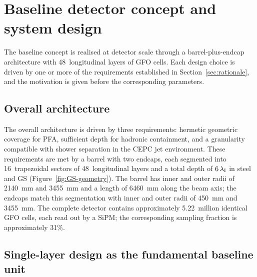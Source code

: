 \section{Baseline detector concept and system design}
\label{sec:design}

The baseline concept is realised at detector scale through a
barrel-plus-endcap architecture with 48~longitudinal layers of
\cellsize GFO cells.
Each design choice is driven by one or more of the requirements
established in Section~\ref{sec:rationale}, and the motivation is
given before the corresponding parameters.

\subsection{Overall architecture}
\label{subsec:architecture}

The overall architecture is driven by three requirements:
hermetic geometric coverage for PFA, sufficient depth for hadronic
containment, and a granularity compatible with shower separation in
the CEPC jet environment.
These requirements are met by a barrel with two endcaps, each
segmented into 16~trapezoidal sectors of 48~longitudinal layers and a
total depth of $6\,\lambda_{\mathrm{I}}$ in steel and GS
(Figure~\ref{fig:GS-geometry}).
The barrel has inner and outer radii of \SI{2140}{mm} and
\SI{3455}{mm} and a length of \SI{6460}{mm} along the beam axis; the
endcaps match this segmentation with inner and outer radii of
\SI{450}{mm} and \SI{3455}{mm}.
The complete detector contains approximately 5.22~million identical
\cellsize GFO cells, each read out by a \sipmsize SiPM; the
corresponding sampling fraction is approximately 31\%.

\subsection{Single-layer design as the fundamental baseline unit}
\label{subsec:onelayer}

